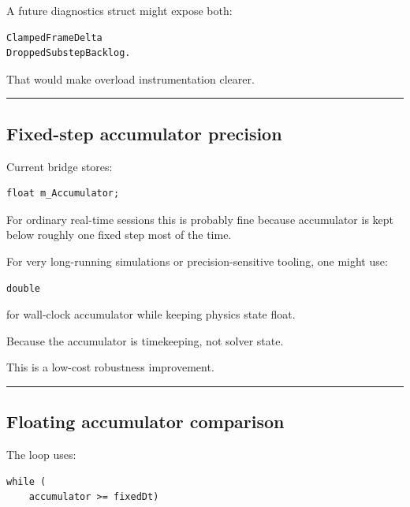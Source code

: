 A future diagnostics struct might expose both:

\begin{verbatim}
ClampedFrameDelta
DroppedSubstepBacklog.
\end{verbatim}

That would make overload instrumentation clearer.

\begin{center}\rule{0.5\linewidth}{0.5pt}\end{center}

\subsection{Fixed-step accumulator precision}\label{06-engine-ii-ch038-fixed-step-accumulator-precision}

\hypertarget{06-engine-ii-ch038-fixed-step-accumulator-precision}{}

Current bridge stores:

\begin{verbatim}
float m_Accumulator;
\end{verbatim}

For ordinary real-time sessions this is probably fine because accumulator is kept below roughly one fixed step most of the time.

For very long-running simulations or precision-sensitive tooling, one might use:

\begin{verbatim}
double
\end{verbatim}

for wall-clock accumulator while keeping physics state float.

Because the accumulator is timekeeping, not solver state.

This is a low-cost robustness improvement.

\begin{center}\rule{0.5\linewidth}{0.5pt}\end{center}

\subsection{Floating accumulator comparison}\label{06-engine-ii-ch038-floating-accumulator-comparison}

\hypertarget{06-engine-ii-ch038-floating-accumulator-comparison}{}

The loop uses:

\begin{verbatim}
while (
    accumulator >= fixedDt)
\end{verbatim}

